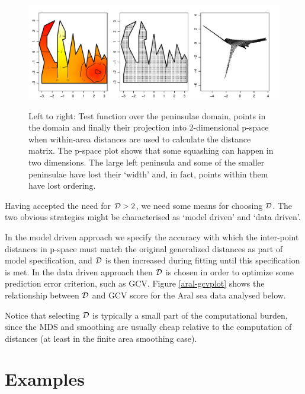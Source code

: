 \documentclass[useAMS, referee]{biom}
\begin{document}
\begin{figure}
\centering
\includegraphics[width=\textwidth]{examples/wt2/wt2-plot.pdf} \\
\caption{Left to right: Test function over the peninsulae domain, points in the domain and finally their projection into 2-dimensional p-space when within-area distances are used to calculate the distance matrix. The p-space plot shows that some squashing can happen in two dimensions. The large left peninsula and some of the smaller peninsulae have lost their `width' and, in fact, points within them have lost ordering.}
\label{wt2-plot}
\end{figure}

Having accepted the need for ${\cal D}>2$, we need some means for choosing $\cal D$. The two obvious strategies might be characterised as `model driven' and `data driven'. 

In the model driven approach we specify the accuracy with which the inter-point distances in p-space must match the original generalized distances as part of model specification, and $\cal D$ is then increased during fitting until this specification is met. In the data driven approach then $\cal D$ is chosen in order to optimize some prediction error criterion, such as GCV.  Figure \ref{aral-gcvplot} shows the relationship between $\cal D$ and GCV score for the Aral sea data analysed below.

Notice that selecting $\cal D$ is typically a small part of the computational burden, since the MDS and smoothing are usually cheap relative to the computation of distances (at least in the finite area smoothing case).


\section{Examples}
\label{examples}
\end{document}
